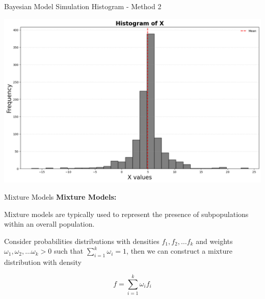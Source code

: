 \documentclass[8pt]{beamer}
\begin{document}
\begin{frame}[fragile]{Bayesian Model Simulation Histogram - Method 2}
\begin{center}
\includegraphics[width=\textwidth]{chapter2-part1-plot3.png}
\end{center}
\end{frame}

\begin{frame}{Mixture Models}
\textbf{Mixture Models:}

\vspace{2mm}

Mixture models are typically used to represent the presence of subpopulations within an overall population. 
\vspace{2mm}

Consider probabilities distributions with densities $f_1,f_2, \ldots f_k$ and weights $\omega_1, \omega_2, \ldots \omega_k >  0$ such that 
$\displaystyle{\sum_{i=1}^k \omega_i =1}$, then we can construct a mixture distribution with density

$$f=\sum_{i=1}^k \omega_i f_i$$
\end{frame}
\end{document}
